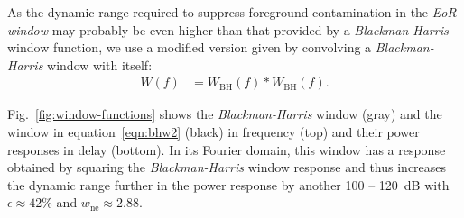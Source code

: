 \documentclass[preprint2,iop,numberedappendix,twocolappendix,appendixfloats]{emulateapj}
\begin{document}
As the dynamic range required to suppress foreground contamination in the {\it EoR window} may probably be even higher than that provided by a {\it Blackman-Harris} window function, we use a modified version given by convolving a {\it Blackman-Harris} window with itself:
\begin{align}\label{eqn:bhw2}
  W(f) &= W_\textrm{BH}(f) \ast W_\textrm{BH}(f).
\end{align}

Fig.~\ref{fig:window-functions} shows the {\it Blackman-Harris} window (gray) and  the window in equation~\ref{eqn:bhw2} (black) in frequency (top) and their power responses in delay (bottom). In its Fourier domain, this window has a response obtained by squaring the {\it Blackman-Harris} window response and thus increases the dynamic range further in the power response by another 100 -- 120~dB with $\epsilon\approx 42\%$ and $w_\textrm{ne} \approx 2.88$.
\end{document}
